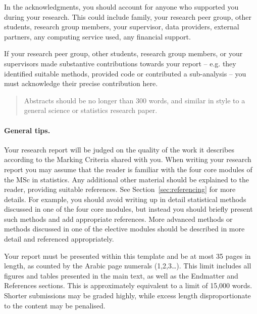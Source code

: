 \declarationdate{\today}
\declaration 

\begin{acknowledgements}
    In the acknowledgments, you should account for anyone who supported you during your research. This could include family, your research peer group, other students, research group members, your supervisor, data providers, external partners, any computing service used, any financial support. 
    
    If your research peer group, other students, research group members, or your supervisors made substantive contributions towards your report -- e.g. they identified suitable methods, provided code or contributed a sub-analysis -- you must acknowledge their precise contribution here.
\end{acknowledgements}

\mainmatter

\begin{abstract}
    Abstracts should be no longer than 300 words, and similar in style to a general science or statistics research paper.
\end{abstract}

\paragraph{General tips.} Your research report will be judged on the quality of the work it describes according to the Marking Criteria shared with you. 
When writing your research report you may assume that the reader is familiar with the four core modules of the MSc in statistics. Any additional other material should be explained to the reader, providing suitable references. See Section~\ref{sec:referencing} for more details. For example, you should avoid writing up in detail statistical methods discussed in one of the four core modules, but instead you should briefly present such methods and add appropriate references. More advanced methods or methods discussed in one of the elective modules should be described in more detail and referenced appropriately. 

Your report must be presented within this template and be at most 35 pages in length, as counted by the Arabic page numerals (1,2,3…). This limit includes all figures and tables presented in the main text, as well as the Endmatter and References sections. This is approximately equivalent to a limit of 15,000 words. Shorter submissions may be graded highly, while excess length disproportionate to the content may be penalised.

